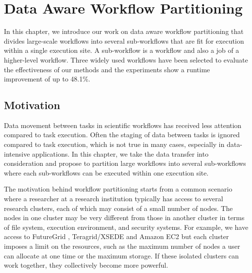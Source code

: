 \chapter{Data Aware Workflow Partitioning}
\label{chap:partitioning}

In this chapter, we introduce our work on data aware workflow partitioning that divides large-scale workflows into several sub-workflows that are fit for execution within a single execution site. A sub-workflow is a workflow and also a job of a higher-level workflow. Three widely used workflows have been selected to evaluate the effectiveness of our methods and the experiments show a runtime improvement of up to 48.1\%. 


\section{Motivation}

Data movement between tasks in scientific workflows has received less attention compared to task execution. Often the staging of data between tasks is ignored compared to task execution, which is not true in many cases, especially in data-intensive applications. In this chapter, we take the data transfer into consideration and propose to partition large workflows into several sub-workflows where each sub-workflows can be executed within one execution site. 

The motivation behind workflow partitioning starts from a common scenario where a researcher at a research institution typically has access to several research clusters, each of which may consist of a small number of nodes. The nodes in one cluster may be very different from those in another cluster in terms of file system, execution environment, and security systems. For example, we have access to FutureGrid \cite{Fox2013FutureGrid}, Teragrid/XSEDE \cite{TeraGrid}  and Amazon EC2 \cite{AmazonAWS} but each cluster imposes a limit on the resources, such as the maximum number of nodes a user can allocate at one time or the maximum storage. If these isolated clusters can work together, they collectively become more powerful. 


